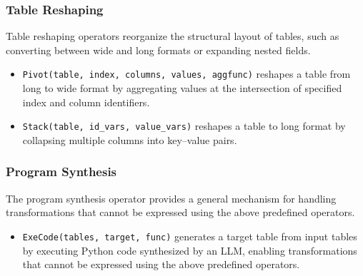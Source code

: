 \subsubsection{Table Reshaping}
Table reshaping operators reorganize the structural layout of tables, such as converting between wide and long formats or expanding nested fields.
%
\begin{itemize}[leftmargin=*]
    \item \texttt{Pivot(table, index, columns, values, aggfunc)} reshapes a table from long to wide format by aggregating values at the intersection of specified index and column identifiers.
    \item \texttt{Stack(table, id\_vars, value\_vars)} reshapes a table to long format by collapsing multiple columns into key–value pairs.
\end{itemize}

\subsubsection{Program Synthesis}
The program synthesis operator provides a general mechanism for handling transformations that cannot be expressed using the above predefined operators.
\begin{itemize}[leftmargin=*]
    \item \texttt{ExeCode(tables, target, func)} generates a target table from input tables by executing Python code synthesized by an LLM, enabling transformations that cannot be expressed using the above predefined operators.
\end{itemize}
